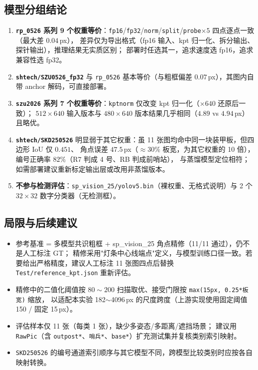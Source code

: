 \documentclass[11pt,a4paper]{ctexart}
\newcommand{\code}[1]{\texttt{\small #1}}
\begin{document}
\subsection{模型分组结论}
\begin{enumerate}\itemsep2pt
  \item \textbf{\code{rp\_0526} 系列 9 个权重等价}：\code{fp16}/\code{fp32}/\code{norm}/\code{split}/\code{probe}$\times5$ 四点逐点一致（最大差 $0.04$\,px），
        差异仅为导出格式（fp16 输入、kpt 归一化、拆分输出、探针输出），推理结果无实质区别；
        部署时任选其一，追求速度选 fp16，追求兼容性选 fp32。
  \item \textbf{\code{shtech/SZU0526\_fp32}} 与 \code{rp\_0526} 基本等价（与粗框偏差 $0.07$\,px），其图内自带 anchor 解码，可直接部署。
  \item \textbf{\code{szu2026} 系列 7 个权重等价}：\code{kptnorm} 仅改变 kpt 归一化（$\times640$ 还原后一致）；
        $512\times640$ 输入版本与 $480\times640$ 版本结果几乎相同（$4.89$ vs $4.94$\,px）且略优。
  \item \textbf{\code{shtech/SKD250526}} 明显弱于其它权重：虽 11 张图均命中同一块装甲板，但四边形 IoU 仅 $0.451$、
        角点误差 $47.5$\,px（$\approx30\%$ 板宽，为其它权重的 10 倍），编号正确率 $82\%$（R7 判成 4 号、RB 判成前哨站），
        与蒸馏模型定位相符；如需部署建议重新标定输出层或改用非蒸馏版本。
  \item \textbf{不参与检测评估}：\code{sp\_vision\_25/yolov5.bin}（裸权重、无格式说明）与 2 个 $32\times32$ 数字分类器（无检测框）。
\end{enumerate}

\subsection{局限与后续建议}
\begin{itemize}\itemsep2pt
  \item 参考基准 = 多模型共识粗框 + sp\_vision\_25 角点精修（11/11 通过），仍不是人工标注 GT；
        精修采用"灯条中心线端点"定义，与模型训练口径一致。若要给出严格精度，建议人工标注 11 张图四点后替换 \code{Test/reference\_kpt.json} 重新评估。
  \item 精修中的二值化阈值按 $80\sim200$ 扫描取优、接受门限按 \code{max(15px, 0.25*板宽)} 缩放，
        以适配本实验 182$\sim$4096\,px 的尺度跨度（上游实现使用固定阈值 150 / 固定 15\,px）。
  \item 评估样本仅 11 张（每类 1 张），缺少多姿态/多距离/遮挡场景；
        建议用 \code{RawPic}（含 \code{outpost*}、\code{哨兵*}、\code{base*}）扩充测试集并复核类别索引映射。
  \item \code{SKD250526} 的编号通道索引顺序与其它模型不同，跨模型比较类别时应按各自映射转换。
\end{itemize}
\end{document}
